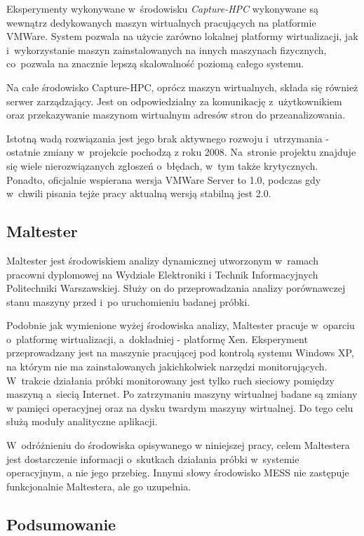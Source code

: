 \documentclass[a4paper,12pt,oneside]{article}
\begin{document}
	Eksperymenty wykonywane w~środowisku \textit{Capture-HPC} wykonywane są wewnątrz dedykowanych maszyn wirtualnych pracujących na platformie VMWare. System pozwala na użycie zarówno lokalnej platformy wirtualizacji, jak i~wykorzystanie maszyn zainstalowanych na innych maszynach fizycznych, co~pozwala na znacznie lepszą skalowalność poziomą całego systemu. 
	
	Na całe środowisko Capture-HPC, oprócz maszyn wirtualnych, składa się również serwer zarządzający. Jest on odpowiedzialny za komunikację z~użytkownikiem oraz przekazywanie maszynom wirtualnym adresów stron do przeanalizowania.
	
	Istotną wadą rozwiązania jest jego brak aktywnego rozwoju i~utrzymania - ostatnie zmiany w~projekcie pochodzą z roku 2008. Na~stronie projektu znajduje się wiele nierozwiązanych zgłoszeń o~błędach, w~tym także krytycznych. Ponadto, oficjalnie wspierana wersja VMWare Server to 1.0, podczas gdy w~chwili pisania tejże pracy aktualną wersją stabilną jest 2.0.
	
	\subsection{Maltester}
	
	Maltester \cite{weiti-maltester} jest środowiskiem analizy dynamicznej utworzonym w~ramach pracowni dyplomowej na Wydziale Elektroniki i Technik Informacyjnych Politechniki Warszawskiej. Służy on do przeprowadzania analizy porównawczej stanu maszyny przed i~po uruchomieniu badanej próbki.
	
	Podobnie jak wymienione wyżej środowiska analizy, Maltester pracuje w~oparciu o~platformę wirtualizacji, a~dokładniej - platformę Xen. Eksperyment przeprowadzany jest na maszynie pracującej pod kontrolą systemu Windows XP, na którym nie ma zainstalowanych jakichkolwiek narzędzi monitorujących. W~trakcie działania próbki monitorowany jest tylko ruch sieciowy pomiędzy maszyną a~siecią Internet. Po zatrzymaniu maszyny wirtualnej badane są zmiany w pamięci operacyjnej oraz na dysku twardym maszyny wirtualnej. Do tego celu służą moduły analityczne aplikacji. 
	
	W~odróżnieniu do środowiska opisywanego w niniejszej pracy, celem Maltestera jest dostarczenie informacji o~skutkach działania próbki w~systemie operacyjnym, a nie jego przebieg. Innymi słowy środowisko MESS nie zastępuje funkcjonalnie Maltestera, ale go uzupełnia.
	
	\subsection{Podsumowanie}
	
\end{document}
